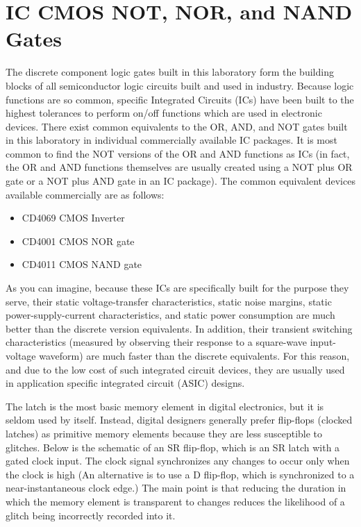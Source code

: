 \documentclass[12pt]{../manual}
\begin{document}
\section{IC CMOS NOT, NOR, and NAND Gates}
The discrete component logic gates built in this laboratory form the building blocks of all semiconductor logic circuits built and used in industry. Because logic functions are so common, specific Integrated Circuits (ICs) have been built to the highest tolerances to perform on/off functions which are used in electronic devices. There exist common equivalents to the OR, AND, and NOT gates built in this laboratory in individual commercially available IC packages. It is most common to find the NOT versions of the OR and AND functions as ICs (in fact, the OR and AND functions themselves are usually created using a NOT plus OR gate or a NOT plus AND gate in an IC package). The common equivalent devices available commercially are as follows:
\begin{itemize}
\item CD4069 CMOS Inverter
\item CD4001 CMOS NOR gate
\item CD4011 CMOS NAND gate
\end{itemize}

As you can imagine, because these ICs are specifically built for the purpose they serve, their static voltage-transfer characteristics, static noise margins, static power-supply-current characteristics, and static power consumption are much better than the discrete version equivalents. In addition, their transient switching characteristics (measured by observing their response to a square-wave input-voltage waveform) are much faster than the discrete equivalents. For this reason, and due to the low cost of such integrated circuit devices, they are usually used in application specific integrated circuit (ASIC) designs.

The latch is the most basic memory element in digital electronics, but it is seldom used by itself. Instead, digital designers generally prefer flip-flops (clocked latches) as primitive memory elements because they are less susceptible to glitches. Below is the schematic of an SR flip-flop, which is an SR latch with a gated clock input. The clock signal synchronizes any changes to occur only when the clock is high (An alternative is to use a D flip-flop, which is synchronized to a near-instantaneous clock edge.) The main point is that reducing the duration in which the memory element is transparent to changes reduces the likelihood of a glitch being incorrectly recorded into it.
\end{document}
